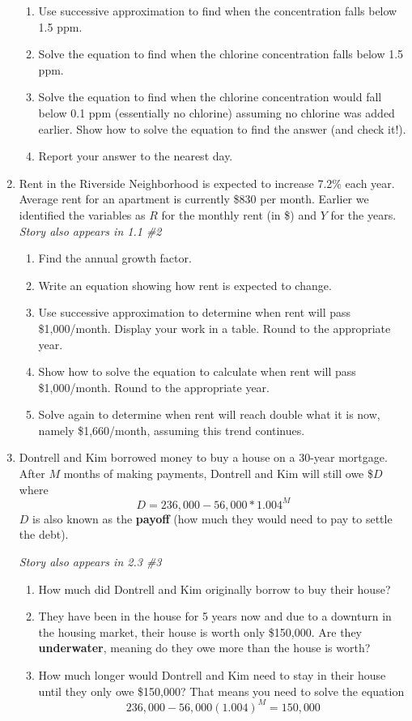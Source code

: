 \begin{enumerate}
\begin{enumerate}
\item Use successive approximation to find when the concentration falls below 1.5 ppm.  \vfill
\item Solve the equation to find when the chlorine concentration falls below 1.5 ppm.  \vfill 
\item Solve the equation to find when the chlorine concentration would fall below 0.1 ppm (essentially no chlorine) assuming no chlorine was added earlier.  Show how to solve the equation to find the answer (and check it!). \vfill
\item Report your answer to the nearest day. \vfill
\end{enumerate} 

\newpage %

\item Rent in the Riverside Neighborhood is expected to increase 7.2\% each year.  Average rent for an apartment is currently \$830 per month.  Earlier we identified the variables as $R$ for the monthly rent  (in \$) and $Y$ for the years.
\hfill \emph{Story also appears in 1.1 \#2} 
\begin{enumerate}
\item Find the annual growth factor. \vfill
\item Write an equation showing how rent is expected to change. \vfill
\item Use successive approximation to determine when rent will pass \$1,000/month.  Display your work in a table.  Round to the appropriate year. \vfill \vfill
\item Show how to solve the equation to calculate when rent will pass \$1,000/month.  Round to the appropriate year. \vfill \vfill
\item Solve again to determine when rent will reach double what it is now, namely  \$1,660/month, assuming this trend continues. \vfill \vfill
\end{enumerate} 

\newpage %

\item Dontrell and Kim borrowed money to buy a house on a 30-year mortgage.  After $M$ months of making payments, Dontrell and Kim will still owe \$$D$ where $$D=236,000-56,000 \ast 1.004^M$$  
$D$ is also known as the \textbf{payoff} (how much they would need to pay to settle the debt).

 \hfill \emph{Story also appears in 2.3 \#3}
 \begin{enumerate}
\item How much did Dontrell and Kim originally borrow to buy their house?   \vfill
\item They have been in the house for 5 years now and due to a downturn in the housing market, their house is worth only \$150,000.   Are they \textbf{underwater}, meaning do they owe more than the house is worth? \vfill
\item How much longer would Dontrell and Kim need to stay in their house until they only owe \$150,000?  That means you need to solve the equation $$236,000-56,000(1.004)^M=150,000$$
 \vfill \vfill
\end{enumerate}

\end{enumerate}


